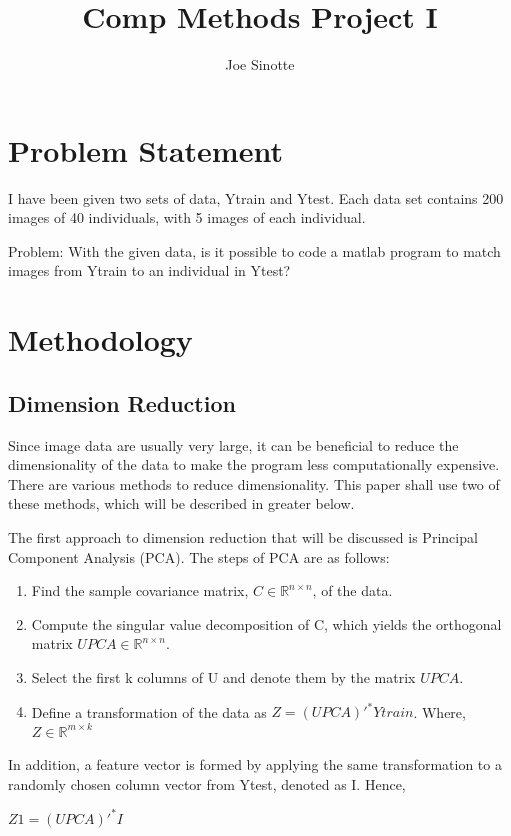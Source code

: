 \documentclass[11pt]{article} %
\title{Comp Methods Project I}
\author{Joe Sinotte}
\begin{document}
\maketitle

\pagebreak
\tableofcontents
\pagebreak

\section{Problem Statement}

I have been given two sets of data, Ytrain and Ytest. Each data set contains 200 images of 40 individuals, with 5 images of each individual.

Problem: With the given data, is it possible to code a matlab program to match images from Ytrain to an individual in Ytest? 
\section{Methodology}

\subsection{Dimension Reduction}
Since image data are usually very large, it can be beneficial to reduce the dimensionality of the data to make the program less computationally expensive. There are various methods to reduce dimensionality. This paper shall use two of these methods, which will be described in greater below.

The first approach to dimension reduction that will be discussed is Principal Component Analysis (PCA). The steps of PCA are as follows:
\begin{enumerate}
\item Find the sample covariance matrix, $C\in\mathbb{R}^{n \times n}$, of the data.
\item Compute the singular value decomposition of C, which yields the orthogonal matrix $UPCA\in\mathbb{R}^{n \times n}$.
\item Select the first k columns of U and denote them by the matrix $UPCA$.
\item Define a transformation of the data as $Z=(UPCA)'^{*}Ytrain$. Where, $Z \in\mathbb{R}^{m \times k}$
\end{enumerate}

In addition, a feature vector is formed by applying the same transformation to a randomly chosen column vector from Ytest, denoted as I. Hence,
\begin{center}
$Z1=(UPCA)'^{*}I$
\end{center}
\end{document}
